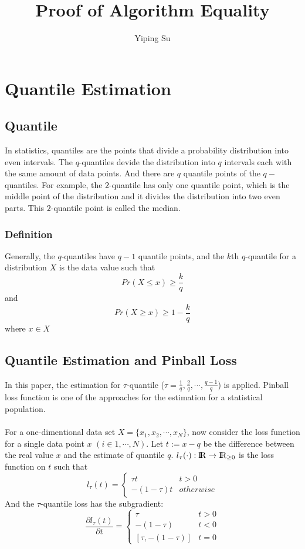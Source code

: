 \documentclass[11pt]{article}
\title{Proof of Algorithm Equality}
\author{Yiping Su}
\begin{document}
\maketitle
            
\section{Quantile Estimation}

\subsection{Quantile}

In statistics, quantiles are the points that divide a probability distribution into even intervals.
The $q$-quantiles devide the distribution into $q$ intervals each with the same amount of data points.
And there are $q$ quantile points of the $q-$quantiles.
For example, the $2$-quantile has only one quantile point, which is the middle point of the distribution
and it divides the distribution into two even parts. This $2$-quantile point is called the median.


\subsubsection{Definition}
Generally, the $q$-quantiles have $q-1$ quantile points, and the $k$th $q$-quantile for a 
distribution $X$ is the data value such that
$$
Pr(X \leq x) \geq \frac{k}{q}
$$
and
$$
Pr(X \geq x) \geq 1 - \frac{k}{q}
$$
where $x \in X$

\subsection{Quantile Estimation and Pinball Loss}
In this paper, the estimation for $\tau$-quantile 
($\tau =  \frac{1}{q}, \frac{2}{q}, \cdots, \frac{q-1}{q}$)
is applied.
Pinball loss function is one of the approaches for the estimation for a statistical population.
\\\\
For a one-dimentional data set $X = \{x_1, x_2, \cdots, x_N\}$, 
now consider the loss function for a single data point $x$ $(i \in {1, \cdots, N})$.
Let $t := x - q$ be the difference between the real value $x$ and the estimate of quantile $q$.
$l_{\tau}(\cdot): \rm I\!R \to \rm I\!R_{\geq 0}$ is the loss function on $t$ such that
$$
l_\tau(t)= 
    \begin{cases}
        \tau t & t > 0\\
        -(1-\tau) t & otherwise
    \end{cases}
$$
And the $\tau$-quantile loss has the {\color{red} subgradient}:
$$
\frac {\partial l_\tau(t)}{\partial t}= 
    \begin{cases}
        \tau                & t > 0\\
        -(1-\tau)           & t < 0\\
        [\tau, -(1 - \tau)] & t = 0
    \end{cases}
$$
\end{document}
